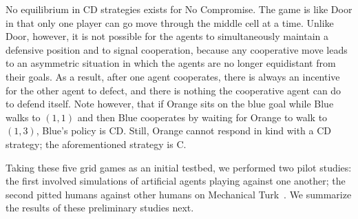 No equilibrium in CD strategies exists for No Compromise.  The game
is like Door in that only one player can go move through the middle
cell at a time.  Unlike Door, however, it is not possible for the
agents to simultaneously maintain a defensive position and to signal
cooperation, because any cooperative move leads to an asymmetric
situation in which the agents are no longer equidistant from their
goals.
As a result, after one agent cooperates, there is always an incentive
for the other agent to defect, and there is nothing the cooperative
agent can do to defend itself.  Note however, that if Orange sits on
the blue goal while Blue walks to $(1,1)$ and then Blue cooperates by
waiting for Orange to walk to $(1,3)$, Blue's policy is CD.  Still,
Orange cannot respond in kind with a CD strategy; the aforementioned
strategy is C.

Taking these five grid games as an initial testbed, we performed two
pilot studies: the first involved simulations of artificial agents
playing against one another; the second pitted humans against other
humans on Mechanical Turk~\cite{austerweil16}.
We summarize the results of these preliminary studies next.

